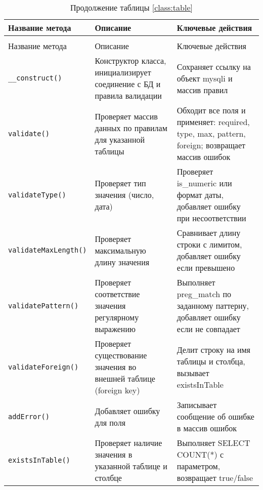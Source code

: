 \renewcommand{\arraystretch}{0.8}
\begin{xltabular}{\textwidth}{|p{4.5cm}|p{5.5cm}|p{5.5cm}|}
	\caption{Методы класса \texttt{validator}}\\
	\hline \centrow Название метода & \centrow Описание & \centrow Ключевые действия \\
	\hline \endfirsthead
	\caption*{Продолжение таблицы \ref{class:table}}\\
	\hline \centrow Название метода & \centrow Описание & \centrow Ключевые действия \\
	\hline \endhead
	
	\texttt{\_\_construct()} & Конструктор класса, инициализирует соединение с БД и правила валидации & Сохраняет ссылку на объект mysqli и массив правил \\\hline
	
	\texttt{validate()} & Проверяет массив данных по правилам для указанной таблицы & Обходит все поля и применяет: required, type, max, pattern, foreign; возвращает массив ошибок \\\hline
	
	\texttt{validateType()} & Проверяет тип значения (число, дата) & Проверяет is\_numeric или формат даты, добавляет ошибку при несоответствии \\\hline
	
	\texttt{validateMaxLength()} & Проверяет максимальную длину значения & Сравнивает длину строки с лимитом, добавляет ошибку если превышено \\\hline
	
	\texttt{validatePattern()} & Проверяет соответствие значения регулярному выражению & Выполняет preg\_match по заданному паттерну, добавляет ошибку если не совпадает \\\hline
	
	\texttt{validateForeign()} & Проверяет существование значения во внешней таблице (foreign key) & Делит строку на имя таблицы и столбца, вызывает existsInTable \\\hline
	
	\texttt{addError()} & Добавляет ошибку для поля & Записывает сообщение об ошибке в массив ошибок \\\hline
	
	\texttt{existsInTable()} & Проверяет наличие значения в указанной таблице и столбце & Выполняет SELECT COUNT(*) с параметром, возвращает true/false \\\hline
	
\end{xltabular}
\renewcommand{\arraystretch}{1.0}
\newpage 

